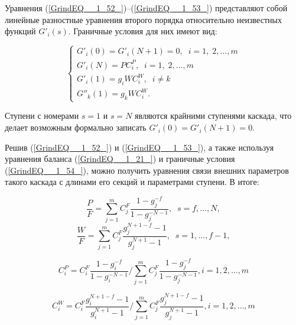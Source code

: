 Уравнения (\ref{GrindEQ__1_52_})--(\ref{GrindEQ__1_53_}) представляют собой линейные разностные уравнения второго порядка относительно неизвестных функций $G'_{i} (s)$. Граничные условия для них имеют вид:

\begin{equation} \label{GrindEQ__1_54_} 
  \left\{\begin{array}{l} {G'_{i} (0)=G'_{i} (N+1)=0,\; \; i=1,\; 2,...,m} \\ {G'_{i} (N)=PC_{i}^{P} ,\; \; i=1,\; 2,...,m} \\ {G'_{i} (1)=g_{i} WC_{i}^{W} ,\; \; i\ne k} \\ {G''_{k} (1)=g_{k} WC_{i}^{W} .} \end{array}\right.  
\end{equation} 

Ступени с номерами $s=1$ и $s=N$ являются крайними ступенями каскада, что делает возможным формально записать $G'_{i} (0)=G'_{i} (N+1)=0$.

Решив (\ref{GrindEQ__1_52_}) и (\ref{GrindEQ__1_53_}), а также используя уравнения баланса (\ref{GrindEQ__1_21_}) и граничные условия (\ref{GrindEQ__1_54_}), можно получить уравнения связи внешних параметров такого каскада с длинами его секций и параметрами ступени. В итоге:

\begin{equation} \label{GrindEQ__1_55_} 
  \frac{P}{F} =\sum _{j=1}^{m}C_{j}^{F} \frac{1-g_{j}^{-f} }{1-g_{j}^{-N-1}} ,\; \; s=f,...,N ,                                                  
  \end{equation} 
  \begin{equation} \label{GrindEQ__1_56_} 
  \frac{W}{F} =\sum _{j=1}^{m}C_{j}^{F} \frac{g_{j}^{N+1-f} -1}{g_{j}^{N+1} -1} ,\; \; s=1,...,f-1 ,                                            
\end{equation}

\begin{equation} \label{GrindEQ__1_57_} 
  C_{i}^{P}=C_{i}^{F} \frac{1-g_{i}^{-f}}{1-g_{i}^{-N-1}} / \sum_{j=1}^{m} C_{j}^{F} \frac{1-g_{j}^{-f}}{1-g_{j}^{-N-1}}, i=1,2, \ldots, m                             
\end{equation}

\begin{equation} \label{GrindEQ__1_58_} 
  C_{i}^{W}=C_{i}^{F} \frac{g_{i}^{N+1-f}-1}{g_{i}^{N+1}-1} / \sum_{j=1}^{m} C_{j}^{F} \frac{g_{j}^{N+1-f}-1}{g_{j}^{N+1}-1}, i=1,2, \ldots, m                         
\end{equation} 

